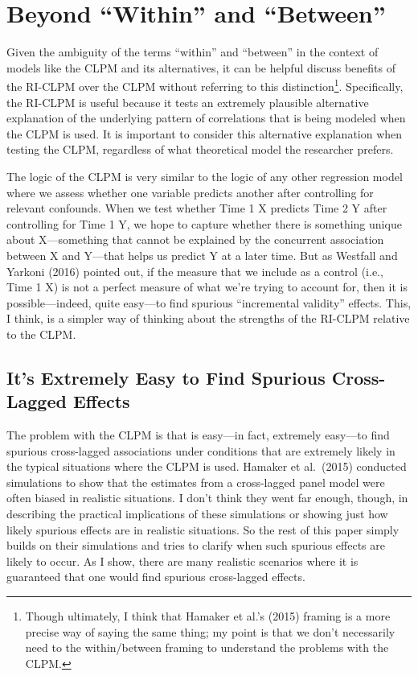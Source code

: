 \documentclass[
  english,
  man,floatsintext]{apa6}
\begin{document}
\hypertarget{beyond-within-and-between}{%
\section{Beyond ``Within'' and ``Between''}\label{beyond-within-and-between}}

Given the ambiguity of the terms ``within'' and ``between'' in the context of models like the CLPM and its alternatives, it can be helpful discuss benefits of the RI-CLPM over the CLPM without referring to this distinction\footnote{Though ultimately, I think that Hamaker et al.'s (2015) framing is a more precise way of saying the same thing; my point is that we don't necessarily need to the within/between framing to understand the problems with the CLPM.}. Specifically, the RI-CLPM is useful because it tests an extremely plausible alternative explanation of the underlying pattern of correlations that is being modeled when the CLPM is used. It is important to consider this alternative explanation when testing the CLPM, regardless of what theoretical model the researcher prefers.

The logic of the CLPM is very similar to the logic of any other regression model where we assess whether one variable predicts another after controlling for relevant confounds. When we test whether Time 1 X predicts Time 2 Y after controlling for Time 1 Y, we hope to capture whether there is something unique about X---something that cannot be explained by the concurrent association between X and Y---that helps us predict Y at a later time. But as Westfall and Yarkoni (2016) pointed out, if the measure that we include as a control (i.e., Time 1 X) is not a perfect measure of what we're trying to account for, then it is possible---indeed, quite easy---to find spurious ``incremental validity'' effects. This, I think, is a simpler way of thinking about the strengths of the RI-CLPM relative to the CLPM.

\hypertarget{its-extremely-easy-to-find-spurious-cross-lagged-effects}{%
\subsection{It's Extremely Easy to Find Spurious Cross-Lagged Effects}\label{its-extremely-easy-to-find-spurious-cross-lagged-effects}}

The problem with the CLPM is that is easy---in fact, extremely easy---to find spurious cross-lagged associations under conditions that are extremely likely in the typical situations where the CLPM is used. Hamaker et al.~(2015) conducted simulations to show that the estimates from a cross-lagged panel model were often biased in realistic situations. I don't think they went far enough, though, in describing the practical implications of these simulations or showing just how likely spurious effects are in realistic situations. So the rest of this paper simply builds on their simulations and tries to clarify when such spurious effects are likely to occur. As I show, there are many realistic scenarios where it is guaranteed that one would find spurious cross-lagged effects.
\end{document}
